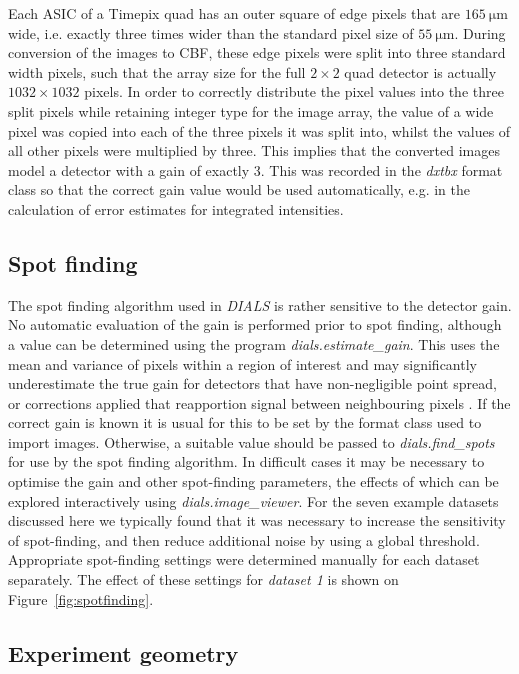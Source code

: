 \documentclass[preprint]{iucr}
\newcommand{\dxtbx}{\emph{dxtbx}\xspace}
\newcommand{\dials}{\emph{DIALS}\xspace}
\newcommand{\dialsestimategain}{\emph{dials.estimate\_gain}\xspace}
\newcommand{\dialsfindspots}{\emph{dials.find\_spots}\xspace}
\newcommand{\dialsimageviewer}{\emph{dials.image\_viewer}\xspace}
\begin{document}
Each ASIC of a Timepix quad has an outer square of edge pixels that are
$\SI{165}{\micro\metre}$ wide, i.e. exactly three times wider than the standard
pixel size of $\SI{55}{\micro\metre}$. During conversion of the images to CBF,
these edge pixels were split into three standard width pixels, such that the
array size for the full $2\times2$ quad detector is actually $1032\times1032$
pixels. In order to correctly distribute the pixel values into the three split
pixels while retaining integer type for the image array, the value of a wide
pixel was copied into each of the three pixels it was split into, whilst the values of
all other pixels were multiplied by three. This implies that the converted
images model a detector with a gain of exactly 3. This was recorded in the
\dxtbx format class so that the correct gain value would be used automatically,
e.g. in the calculation of error estimates for integrated intensities.

\subsection{Spot finding \label{sec:spot_finding}}

The spot finding algorithm used in \dials is rather sensitive to the detector
gain. No automatic evaluation of the gain is performed prior to spot finding,
although a value can be determined using the program \dialsestimategain. This
uses the mean and variance of pixels within a region of interest
\cite{leslie2006integration} and may significantly underestimate the true gain
for detectors that have non-negligible point spread, or corrections applied
that reapportion signal between neighbouring pixels \cite{Waterman2010}. If the
correct gain is known it is usual for this to be set by the format class used
to import images. Otherwise, a suitable value should be passed to
\dialsfindspots for use by the spot finding algorithm. In difficult cases it
may be necessary to optimise the gain and other spot-finding parameters, the
effects of which can be explored interactively using \dialsimageviewer. For the
seven example datasets discussed here we typically found that it was necessary
to increase the sensitivity of spot-finding, and then reduce additional noise
by using a global threshold. Appropriate spot-finding settings were determined
manually for each dataset separately. The effect of these settings for
\emph{dataset 1} is shown on Figure~\ref{fig:spotfinding}.

\subsection{Experiment geometry}
\end{document}
